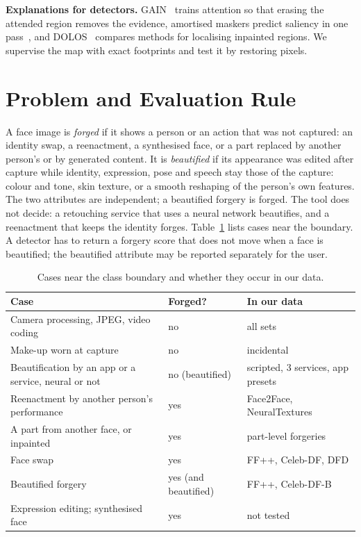 \documentclass[conference]{IEEEtran}
\begin{document}
\textbf{Explanations for detectors.} GAIN~\cite{gain} trains attention so that erasing the attended region removes the
evidence, amortised maskers predict saliency in one pass~\cite{dabkowski2017,phang2020}, and DOLOS~\cite{dolos} compares
methods for localising inpainted regions. We supervise the map with exact footprints and test it by restoring pixels.

\section{Problem and Evaluation Rule}
\label{sec:protocol}
A face image is \emph{forged} if it shows a person or an action that was not captured: an identity swap, a reenactment, a
synthesised face, or a part replaced by another person's or by generated content. It is \emph{beautified} if its
appearance was edited after capture while identity, expression, pose and speech stay those of the capture: colour and
tone, skin texture, or a smooth reshaping of the person's own features. The two attributes are independent; a beautified
forgery is forged. The tool does not decide: a retouching service that uses a neural network beautifies, and a reenactment
that keeps the identity forges. Table~\ref{tab:labels} lists cases near the boundary. A detector has to return a forgery
score that does not move when a face is beautified; the beautified attribute may be reported separately for the user.

\begin{table}[t]
\centering
\caption{Cases near the class boundary and whether they occur in our data.}
\label{tab:labels}
\footnotesize
\setlength{\tabcolsep}{3pt}
\begin{tabular}{@{}>{\raggedright\arraybackslash}p{}l>{\raggedright\arraybackslash}p{}@{}}
\toprule
Case & Forged? & In our data \\
\midrule
Camera processing, JPEG, video coding & no & all sets \\
Make-up worn at capture & no & incidental \\
Beautification by an app or a service, neural or not & no (beautified) & scripted, 3 services, app presets \\
Reenactment by another person's performance & yes & Face2Face, NeuralTextures \\
A part from another face, or inpainted & yes & part-level forgeries \\
Face swap & yes & FF++, Celeb-DF, DFD \\
Beautified forgery & yes (and beautified) & FF++, Celeb-DF-B \\
Expression editing; synthesised face & yes & not tested \\
\bottomrule
\end{tabular}
\end{table}
\end{document}
